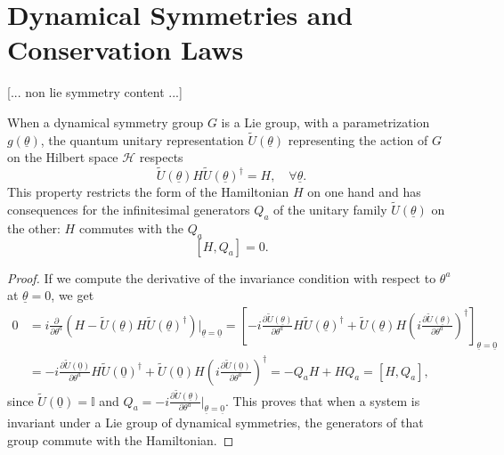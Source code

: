 \section{Dynamical Symmetries and Conservation Laws}

 [... non lie symmetry content ...]

When a dynamical symmetry group \(G\) is a Lie group, with a parametrization \(g(\underline{\theta})\), the quantum unitary representation \(\tilde{U}(\underline{\theta})\) representing the action of \(G\) on the Hilbert space \(\mathcal{H}\) respects
\[
    \tilde{U}(\underline{\theta})  H \tilde{U}(\underline{\theta})^\dagger = H, \quad \forall \underline{\theta}.
\]
This property restricts the form of the Hamiltonian \(H\) on one hand and has consequences for the infinitesimal generators \(Q_a\) of the unitary family \(\tilde{U}(\underline{\theta})\) on the other: \(H\) commutes with the \(Q_a\)
\[
    [H, Q_a] = 0.
\]
\begin{proof}
    If we compute the derivative of the invariance condition with respect to \(\theta^a\) at \(\underline{\theta} = 0\), we get
    \[
        \begin{aligned}
            0 & = i \frac{\partial}{\partial \theta^a} (H - \tilde{U}(\underline{\theta}) H \tilde{U}(\underline{\theta})^\dagger) \bigg|_{\underline{\theta} = \underline{0}} = \left[ -i \frac{\partial \tilde{U}(\underline{\theta})}{\partial \theta^a} H \tilde{U}(\underline{\theta})^\dagger + \tilde{U}(\underline{\theta})H\left( i \frac{\partial \tilde{U}(\underline{\theta})}{\partial \theta^a}\right)^{\dagger} \right]_{\underline{\theta} = \underline{0}} \\
              & = -i \frac{\partial \tilde{U}(\underline{0})}{\partial \theta^a} H \tilde{U}(\underline{0})^\dagger + \tilde{U}(\underline{0})H\left( i \frac{\partial \tilde{U}(\underline{0})}{\partial \theta^a}\right)^{\dagger} = - Q_a H + H Q_a = [H, Q_a],
        \end{aligned}
    \]
    since \(\tilde{U}(\underline{0}) = \mathbb{I}\) and \(Q_a = -i \frac{\partial \tilde{U}(\underline{\theta})}{\partial \theta^a} \big|_{\underline{\theta} = \underline{0}}\). This proves that when a system is invariant under a Lie group of dynamical symmetries, the generators of that group commute with the Hamiltonian.
\end{proof}

